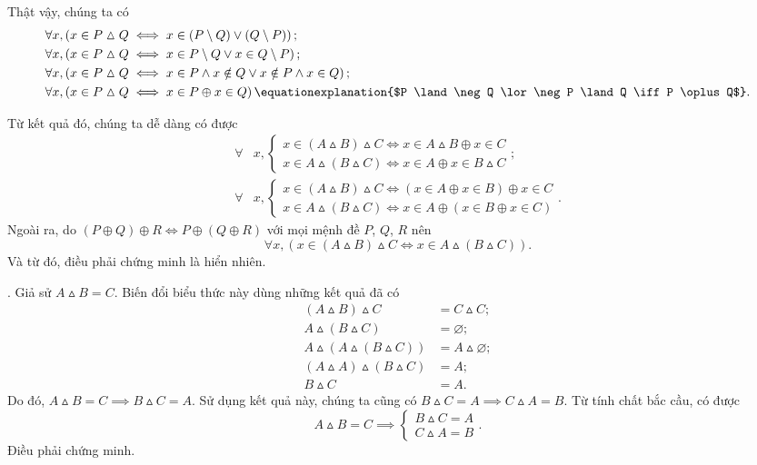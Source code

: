 Thật vậy, chúng ta có
\begin{align*}
   \forall x, &\left(x \in P \vartriangle Q \iff x \in (P \setminus Q) \lor (Q \setminus P)\right); \\
   \forall x, &\left(x \in P \vartriangle Q \iff x \in P \setminus Q \lor x \in Q \setminus P\right) ; \\
   \forall x, &\left(x \in P \vartriangle Q \iff x \in P \land x \notin Q \lor x \notin P \land x \in Q\right) ; \\
   \forall x, &\left(x \in P \vartriangle Q \iff x \in P \oplus x \in Q\right) \equationexplanation{$P \land \neg Q \lor \neg P \land Q \iff P \oplus Q$}.
\end{align*}

Từ kết quả đó, chúng ta dễ dàng có được
\begin{align*}
   \forall &x, \begin{cases}
      x \in (A \vartriangle B) \vartriangle C \iff x \in A \vartriangle B \oplus x \in C \\
      x \in A \vartriangle (B \vartriangle C) \iff x \in A \oplus x \in B \vartriangle C 
   \end{cases}; \\
   \forall &x, \begin{cases}
      x \in (A \vartriangle B) \vartriangle C \iff (x \in A \oplus x \in B) \oplus x \in C \\
      x \in A \vartriangle (B \vartriangle C) \iff x \in A \oplus (x \in B \oplus x \in C) 
   \end{cases}.
\end{align*}
Ngoài ra, do $(P \oplus Q) \oplus R \iff P \oplus (Q \oplus R)$ với mọi mệnh đề $P$, $Q$, $R$ nên 
\begin{equation*}
   \forall x, (x \in (A \vartriangle B) \vartriangle C \iff x \in A \vartriangle (B \vartriangle C)).
\end{equation*}
Và từ đó, điều phải chứng minh là hiển nhiên.

. Giả sử $A \vartriangle B = C$. Biến đổi biểu thức này dùng những kết quả đã có
\begin{align*}
   (A \vartriangle B) \vartriangle C &= C \vartriangle C; \\
   A \vartriangle (B \vartriangle C) &= \varnothing; \\
   A \vartriangle (A \vartriangle (B \vartriangle C)) &= A \vartriangle \varnothing; \\
   (A \vartriangle A) \vartriangle (B \vartriangle C) &= A; \\
   B \vartriangle C &= A.
\end{align*}
Do đó, $A \vartriangle B = C \implies B \vartriangle C = A$. Sử dụng kết quả này, chúng ta cũng có $B \vartriangle C = A \implies C \vartriangle A = B$. Từ tính chất bắc cầu, có được
\begin{equation*}
   A \vartriangle B = C \implies \begin{cases}
      B \vartriangle C = A \\
      C \vartriangle A = B
   \end{cases}.
\end{equation*}
Điều phải chứng minh.

